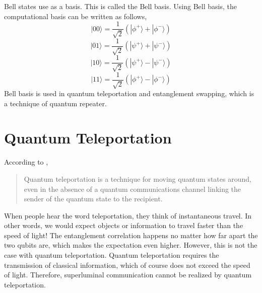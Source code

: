 Bell states use as a basis. 
This is called the Bell basis.
Using Bell basis, the computational basis can be written as follows\cite{q-leap_Bell},
\begin{equation}
    |00\rangle = \frac{1}{\sqrt{2}} (|\phi^+\rangle + |\phi^-\rangle)
\end{equation}
\begin{equation}
    |01\rangle = \frac{1}{\sqrt{2}} (|\psi^+\rangle + |\psi^-\rangle)
\end{equation}
\begin{equation}
    |10\rangle = \frac{1}{\sqrt{2}} (|\psi^+\rangle - |\psi^-\rangle)
\end{equation}
\begin{equation}
    |11\rangle = \frac{1}{\sqrt{2}} (|\phi^+\rangle - |\phi^-\rangle)
\end{equation}
Bell basis is used in quantum teleportation and entanglement swapping, which is a technique of quantum repeater\cite{q-leap_Bell}.

\section{Quantum Teleportation}
According to \cite{nielsen},
\begin{quote}
    Quantum teleportation is a technique for moving quantum states around, even in the absence of a quantum communications channel linking the sender of the quantum state to the recipient.
\end{quote}

When people hear the word teleportation, they think of instantaneous travel.
In other words, we would expect objects or information to travel faster than the speed of light!
The entanglement correlation happens no matter how far apart the two qubits are, which makes the expectation even higher.
However, this is not the case with quantum teleportation.
Quantum teleportation requires the transmission of classical information, which of course does not exceed the speed of light.
Therefore, superluminal communication cannot be realized by quantum teleportation.

